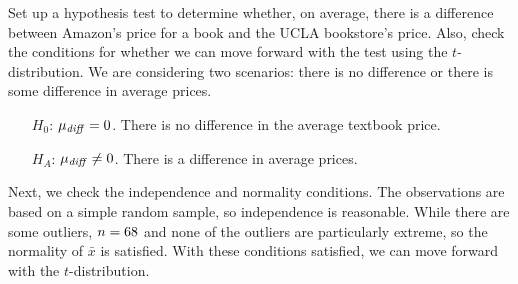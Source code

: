 \begin{examplewrap}
\begin{nexample}{Set up a hypothesis test
    to determine whether, on average, there is a difference
    between Amazon's price for a book and the UCLA
    bookstore's price.
    Also, check the conditions for whether we can move
    forward with the test using the $t$-distribution.}
  \label{htSetupTextbookPriceDiff}%
  We are considering two scenarios: there is no difference
  or there is some difference in average prices.
  \begin{itemize}
  \setlength{\itemsep}{0mm}
  \item[$H_0$:]
      $\mu_{\text{\emph{diff}}} = 0$.
      There is no difference in the average textbook price.
  \item[$H_A$:]
      $\mu_{\text{\emph{diff}}} \neq 0$.
      There is a difference in average prices.
  \end{itemize}

  Next, we check the independence and normality conditions.
  The observations are based on a simple random sample,
  so independence is reasonable.
  While there are some outliers,
  $n = 68{}$ and none of the outliers
  are particularly extreme, so the normality
  of $\bar{x}$ is satisfied.
  With these conditions satisfied,
  we can move forward with the $t$-distribution.
\end{nexample}
\end{examplewrap}

